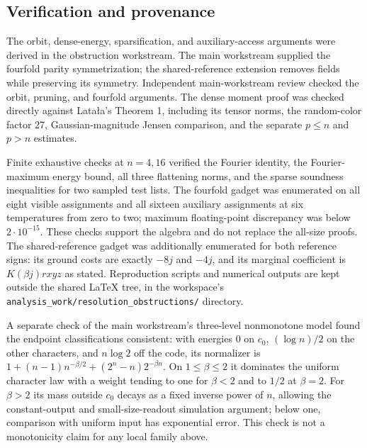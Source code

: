 \subsection{Verification and provenance}
\label{res:verification}

The orbit, dense-energy, sparsification, and auxiliary-access arguments
were derived in the obstruction workstream.  The main workstream
supplied the fourfold parity symmetrization; the shared-reference
extension removes fields while preserving its symmetry.  Independent
main-workstream review checked the orbit, pruning, and fourfold
arguments.  The dense moment proof was checked directly against
Lata\l a's Theorem 1, including its tensor norms, the random-color
factor 27, Gaussian-magnitude Jensen comparison, and the separate
$p\le n$ and $p>n$ estimates.

Finite exhaustive checks at $n=4,16$ verified the Fourier identity,
the Fourier-maximum energy bound, all three flattening norms, and
the sparse soundness inequalities for two sampled test lists.  The
fourfold gadget was enumerated on all eight visible assignments and
all sixteen auxiliary assignments at six temperatures from zero to
two; maximum floating-point discrepancy was below $2\cdot10^{-15}$.
These checks support the algebra and do not replace the all-size
proofs.  The shared-reference gadget was additionally enumerated for
both reference signs: its ground costs are exactly $-8j$ and $-4j$,
and its marginal coefficient is $K(\beta j)rxyz$ as stated.
Reproduction scripts and numerical outputs are kept outside
the shared LaTeX tree, in the workspace's
\texttt{analysis\_work/resolution\_obstructions/} directory.

A separate check of the main workstream's three-level nonmonotone
model found the endpoint classifications consistent: with energies
$0$ on $c_0$, $(\log n)/2$ on the other characters, and $n\log2$
off the code, its normalizer is
$1+(n-1)n^{-\beta/2}+(2^n-n)2^{-\beta n}$.  On $1\le\beta\le2$
it dominates the uniform character law with a weight tending to one
for $\beta<2$ and to $1/2$ at $\beta=2$.  For $\beta>2$ its mass
outside $c_0$ decays as a fixed inverse power of $n$, allowing the
constant-output and small-size-readout simulation argument; below
one, comparison with uniform input has exponential error.  This
check is not a monotonicity claim for any local family above.
